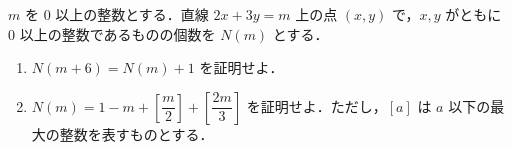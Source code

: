 \documentclass[../../main.tex]{subfiles}
\begin{document}
$m$ を $0$ 以上の整数とする．直線 $2x+3y=m$ 上の点 $(x,y)$ で，$x, y$ がともに $0$ 以上の整数であるものの個数を $N(m)$ とする．
\begin{enumerate}
  \item $N(m+6)=N(m)+1$ を証明せよ．
  \item $N(m)=1-m+\left[\dfrac{m}{2}\right]+\left[\dfrac{2m}{3}\right]$ を証明せよ．ただし，$[a]$ は $a$ 以下の最大の整数を表すものとする．
\end{enumerate}
\end{document}
